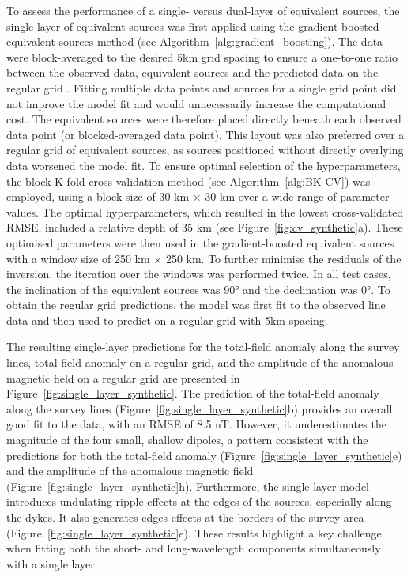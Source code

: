 To assess the performance of a single- versus dual-layer of equivalent sources, the single-layer of equivalent sources was first applied using the gradient-boosted equivalent sources method (see Algorithm~\ref{alg:gradient_boosting}). The data were block-averaged to the desired 5km grid spacing to ensure a one-to-one ratio between the observed data, equivalent sources and the predicted data on the regular grid \citep{Soler2021}. Fitting multiple data points and sources for a single grid point did not improve the model fit and would unnecessarily increase the computational cost. The equivalent sources were therefore placed directly beneath each observed data point (or blocked-averaged data point). This layout was also preferred over a regular grid of equivalent sources, as sources positioned without directly overlying data worsened the model fit. To ensure optimal selection of the hyperparameters, the block K-fold cross-validation method (see Algorithm~\ref{alg:BK-CV}) was employed, using a block size of 30 km $\times$ 30 km over a wide range of parameter values. The optimal hyperparameters, which resulted in the lowest cross-validated RMSE, included a relative depth of 35 km (see Figure~\ref{fig:cv_synthetic}a). These optimised parameters were then used in the gradient-boosted equivalent sources with a window size of 250 km $\times$ 250 km. To further minimise the residuals of the inversion, the iteration over the windows was performed twice. In all test cases, the inclination of the equivalent sources was \ang{90} and the declination was \ang{0}. To obtain the regular grid predictions, the model was first fit to the observed line data and then used to predict on a regular grid with 5km spacing.

The resulting single-layer predictions for the total-field anomaly along the survey lines, total-field anomaly on a regular grid, and the amplitude of the anomalous magnetic field on a regular grid are presented in Figure~\ref{fig:single_layer_synthetic}. The prediction of the total-field anomaly along the survey lines (Figure~\ref{fig:single_layer_synthetic}b) provides an overall good fit to the data, with an RMSE of 8.5 nT. However, it underestimates the magnitude of the four small, shallow dipoles, a pattern consistent with the predictions for both the total-field anomaly (Figure~\ref{fig:single_layer_synthetic}e) and the amplitude of the anomalous magnetic field (Figure~\ref{fig:single_layer_synthetic}h). Furthermore, the single-layer model introduces undulating ripple effects at the edges of the sources, especially along the dykes. It also generates edges effects at the borders of the survey area (Figure~\ref{fig:single_layer_synthetic}e). These results highlight a key challenge when fitting both the short- and long-wavelength components simultaneously with a single layer.

